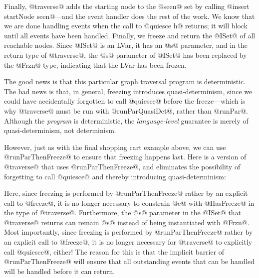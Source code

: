 Finally, @traverse@ adds the starting node to the @seen@ set by
calling @insert startNode seen@---and the event handler does the rest
of the work.  We know that we are done handling events when the call
to @quiesce h@ returns; it will block until all events have been
handled.  Finally, we freeze and return the @ISet@ of all reachable
nodes.  Since @ISet@ is an LVar, it has an @s@ parameter, and in the
return type of @traverse@, the @s@ parameter of @ISet@ has been
replaced by the @Frzn@ type, indicating that the LVar has been frozen.

The good news is that this particular graph traversal program is
deterministic.  The bad news is that, in general, freezing introduces
quasi-determinism, since we could have accidentally forgotten to call
@quiesce@ before the freeze---which is why @traverse@ must be run with
@runParQuasiDet@, rather than @runPar@.  Although the \emph{program}
is deterministic, the \emph{language-level} guarantee is merely of
quasi-determinism, not determinism.

However, just as with the final shopping cart example above, we can
use @runParThenFreeze@ to ensure that freezing happens last.  Here is
a version of @traverse@ that uses @runParThenFreeze@, and eliminates
the possibility of forgetting to call @quiesce@ and thereby
introducing quasi-determinism:

\singlespacing

\doublespacing

\noindent Here, since freezing is performed by @runParThenFreeze@
rather by an explicit call to @freeze@, it is no longer necessary to
constrain @e@ with @HasFreeze@ in the type of @traverse@.
Furthermore, the @s@ parameter in the @ISet@ that @traverse@ returns
can remain @s@ instead of being instantiated with @Frzn@.  Most
importantly, since freezing is performed by @runParThenFreeze@ rather
by an explicit call to @freeze@, it is no longer necessary for
@traverse@ to explicitly call @quiesce@, either!  The reason for this
is that the implicit barrier of @runParThenFreeze@ will ensure that
all outstanding events that can be handled will be handled before it
can return.
